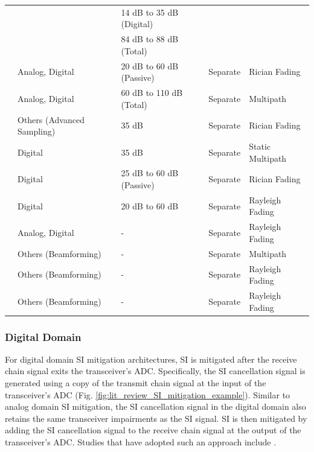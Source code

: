 \begin{table}[]
{\begin{tabular}{lllll}
														& 																												&	14 dB to 35 dB (Digital)	&													& 										\\
														& 																												&	84 dB to 88 dB (Total)		&													& 										\\ 
\cite{ahmed2013rate}				& Analog, Digital																					& 20 dB to 60 dB (Passive)	& Separate								& Rician Fading 			\\ 
\cite{syrjala2016analysis}	& Analog, Digital																					&	60 dB to 110 dB (Total)		& Separate								& Multipath 					\\
\cite{bernhardt2018self} 		& Others (Advanced Sampling)															& 35 dB											& Separate								& Rician Fading 			\\
\cite{korpi2014full}				& Digital																									& 35 dB											& Separate								& Static Multipath 		\\ 
\cite{ahmed2015all}					& Digital																									& 25 dB to 60 dB (Passive)	& Separate								& Rician Fading 			\\ 
\cite{li2018self}						& Digital																									&	20 dB to 60 dB						& Separate								& Rayleigh Fading \\ 
\cite{shende2018half}				& Analog, Digital																					& -													& Separate								& Rayleigh Fading 		\\  
\cite{hwang2017multi}				& Others (Beamforming)																		& - 												& Separate								& Multipath 					\\ 
\cite{chalise2017beamforming}	& Others (Beamforming)																	& -													& Separate								& Rayleigh Fading 		\\ 
\cite{mohammadi2018beamforming}	&	Others (Beamforming)																& -													& Separate								& Rayleigh Fading \\ \hline
\end{tabular}}
\end{table}

\subsubsection{Digital Domain}
For digital domain SI mitigation architectures, SI is mitigated after the receive chain signal exits the transceiver's ADC. Specifically, the SI cancellation signal is generated using a copy of the transmit chain signal at the input of the transceiver's ADC (Fig. \ref{fig:lit_review_SI_mitigation_example}). Similar to analog domain SI mitigation, the SI cancellation signal in the digital domain also retains the same transceiver impairments as the SI signal. SI is then mitigated by adding the SI cancellation signal to the receive chain signal at the output of the transceiver's ADC. Studies that have adopted such an approach include \cite{amjad2018low,sahai2013impact,ahmed2013rate,syrjala2016analysis,korpi2014full,ahmed2015all,li2018self}.


